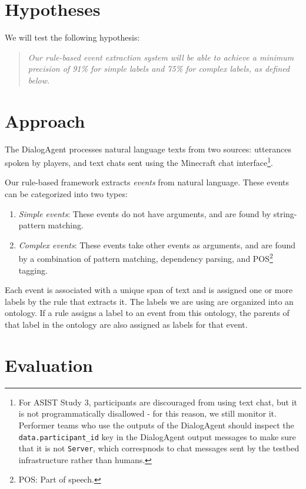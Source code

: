 \section{Hypotheses}

We will test the following hypothesis:

\begin{quote}
    \itshape
    Our rule-based event extraction system will be able to achieve a minimum
    precision of 91\% for simple labels and 75\% for complex labels, as defined
    below.
\end{quote}

\section{Approach}

The DialogAgent processes natural language texts from two sources: utterances
spoken by players, and text chats sent using the Minecraft chat
interface\footnote{For ASIST Study 3, participants are discouraged from using
    text chat, but it is not programmatically disallowed - for this reason, we
    still monitor it. Performer teams who use the outputs of the DialogAgent
    should inspect the \texttt{data.participant\_id} key in the DialogAgent
    output messages to make sure that it is not \texttt{Server}, which
correspnods to chat messages sent by the testbed infrastructure rather than
humans.}.

Our rule-based framework extracts \emph{events} from natural language. These
events can be categorized into two types:

\begin{enumerate}
    \item \emph{Simple events}: These events do not have arguments, and are
        found by string-pattern matching.
    \item \emph{Complex events}: These events take other events as arguments,
        and are found by a combination of pattern matching, dependency parsing,
        and POS\footnote{POS: Part of speech.} tagging.
\end{enumerate}

Each event is associated with a unique span of text and is assigned one or more
labels by the rule that extracts it. The labels we are using are organized into
an ontology.  If a rule assigns a label to an event from this ontology, the
parents of that label in the ontology are also assigned as labels for that
event.

\section{Evaluation}

